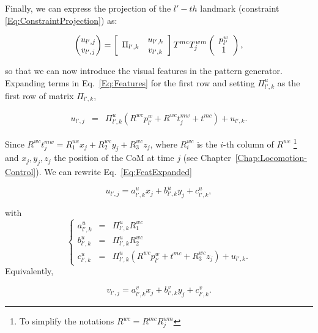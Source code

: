 Finally, we can express the projection of the $l'-th$ landmark (constraint \ref{Eq:ConstraintProjection}) as:

\begin{equation}
\label{Eq:Features}
 \left(
 \begin{matrix}
  u_{l',j} \\
  v_{l',j}
 \end{matrix}
 \right) = 
\left[
\begin{array}{cc}
\multirow{2}{*}{$\Pi_{l',k}$} & u_{l',k} \\
& v_{l',k} \\
\end{array}
\right]
 T^{mc} T^{wm}_j \left( \begin{array}{c}
 p^{w}_{l'}\\
 1
 \end{array}\right),
\end{equation}

\noindent so that we can now introduce the visual features in the pattern generator. Expanding terms in Eq.~\ref{Eq:Features} for the first row and setting $\Pi^u_{l',k}$ as the first row of matrix $\Pi_{l',k}$,

\begin{eqnarray}
\label{Eq:FeatExpanded}
 u_{l',j} &= &\Pi^u_{l',k} (R^{wc} p^{w}_{l'} + R^{wc} t^{mw}_j + t^{mc}) + u_{l',k}.
\end{eqnarray}

Since $R^{wc} t^{mw}_j = R^{wc}_1 x_j + R^{wc}_2 y_j + R^{wc}_3 z_j$, where $R^{wc}_i$ is the $i$-th column of $R^{wc}$
\footnote{To simplify the notations $R^{wc}=R^{mc}R_j^{wm}$}
and $x_j,y_j,z_j$ the position of the CoM at time $j$ (see Chapter~\ref{Chap:Locomotion-Control}). We can rewrite Eq.~\ref{Eq:FeatExpanded}

\begin{equation}
\label{Eq:FeaturesUReduced}
 u_{l',j} = a^u_{l',k} x_j + b^u_{l',k} y_j + c^u_{l',k},
\end{equation}

\noindent with 
$$
\left\{
\begin{array}{ccl}
a^u_{l',k} & = & \Pi^u_{l',k} R^{wc}_1\\
b^u_{l',k} & = & \Pi^u_{l',k} R^{wc}_2\\
c^u_{l',k} & = & \Pi^u_{l',k} (R^{wc} p^{w}_{l'} + t^{mc} + R^{wc}_3 z_j) + u_{l',k}.
\end{array}
\right.
$$
Equivalently,

\begin{equation}
\label{Eq:FeaturesVReduced}
  v_{l',j} = a^v_{l',k} x_j + b^v_{l',k} y_j + c^v_{l',k}.
\end{equation}

